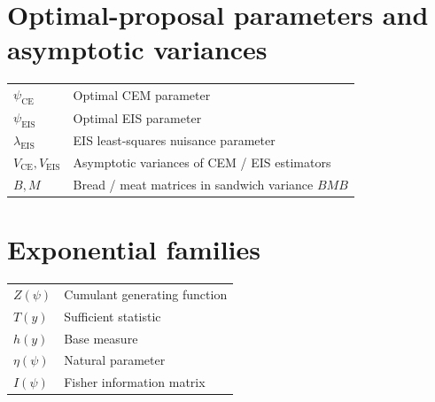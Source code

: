 \section*{Optimal-proposal parameters and asymptotic variances}
\noindent
\begin{tabular}{@{} p{\symcolwidth} p{\dimexpr\linewidth-\symcolwidth-2\tabcolsep\relax} @{}}
$\psi_\mathrm{CE}$              & Optimal CEM parameter \\
$\psi_\mathrm{EIS}$             & Optimal EIS parameter \\
$\lambda_\mathrm{EIS}$          & EIS least-squares nuisance parameter \\
$V_\mathrm{CE}, V_\mathrm{EIS}$ & Asymptotic variances of CEM / EIS estimators \\
$B, M$                          & Bread / meat matrices in sandwich variance $BMB$ \\
\end{tabular}

\section*{Exponential families}
\noindent
\begin{tabular}{@{} p{\symcolwidth} p{\dimexpr\linewidth-\symcolwidth-2\tabcolsep\relax} @{}}
$Z(\psi)$    & Cumulant generating function \\
$T(y)$       & Sufficient statistic \\
$h(y)$       & Base measure \\
$\eta(\psi)$ & Natural parameter\\
$I(\psi)$    & Fisher information matrix \\
\end{tabular}

